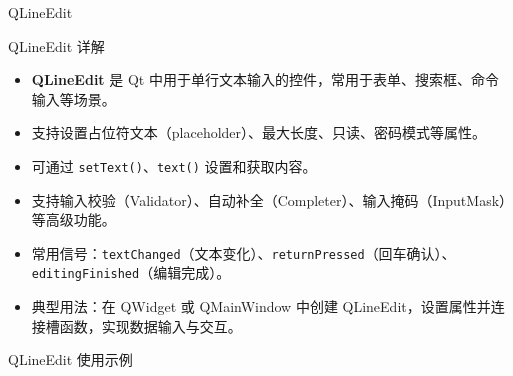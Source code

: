 \documentclass[UTF8,aspectratio=169]{beamer}
\begin{document}
\begin{frame}{QLineEdit}
    \begin{ytublock}{QLineEdit 详解}
        \begin{itemize}
            \item \textbf{QLineEdit} 是 Qt 中用于单行文本输入的控件，常用于表单、搜索框、命令输入等场景。
            \item 支持设置占位符文本（placeholder）、最大长度、只读、密码模式等属性。
            \item 可通过 \texttt{setText()}、\texttt{text()} 设置和获取内容。
            \item 支持输入校验（Validator）、自动补全（Completer）、输入掩码（InputMask）等高级功能。
            \item 常用信号：\texttt{textChanged}（文本变化）、\texttt{returnPressed}（回车确认）、\texttt{editingFinished}（编辑完成）。
            \item 典型用法：在 QWidget 或 QMainWindow 中创建 QLineEdit，设置属性并连接槽函数，实现数据输入与交互。
        \end{itemize}
    \end{ytublock}
\end{frame}

\begin{frame}[fragile]{QLineEdit 使用示例}
    \begin{columns}
        \begin{column}{0.48\textwidth}
            \inputminted[firstline=1,lastline=19]{cpp}{code/qt_lineedit_example.cpp}
        \end{column}
        \begin{column}{0.48\textwidth}
            \inputminted[firstline=20,lastline=38]{cpp}{code/qt_lineedit_example.cpp}
        \end{column}
    \end{columns}
\end{frame}
\end{document}
